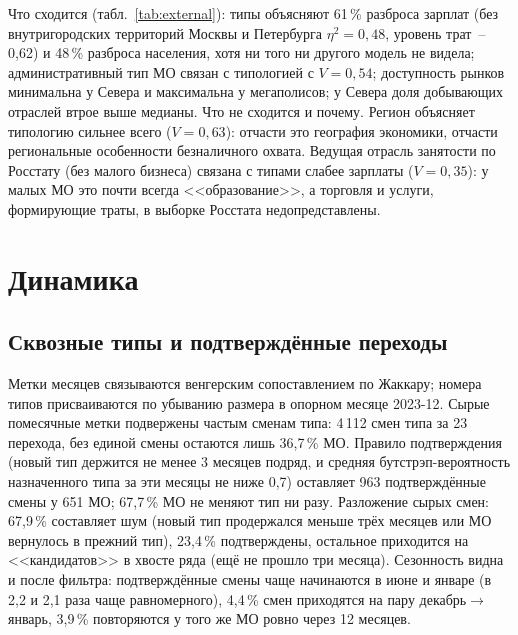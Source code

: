 \documentclass[11pt,a4paper]{article}
\begin{document}
Что сходится (табл.~\ref{tab:external}): типы объясняют 61\,\% разброса зарплат (без внутригородских территорий Москвы и Петербурга $\eta^2=0{,}48$, уровень трат~-- 0,62) и 48\,\% разброса населения, хотя ни того ни другого модель не видела; административный тип МО связан с типологией с $V=0{,}54$; доступность рынков минимальна у Севера и максимальна у мегаполисов; у Севера доля добывающих отраслей втрое выше медианы. Что не сходится и почему. Регион объясняет типологию сильнее всего ($V=0{,}63$): отчасти это география экономики, отчасти региональные особенности безналичного охвата. Ведущая отрасль занятости по Росстату (без малого бизнеса) связана с типами слабее зарплаты ($V=0{,}35$): у малых МО это почти всегда <<образование>>, а торговля и услуги, формирующие траты, в выборке Росстата недопредставлены.

\section{Динамика}\label{sec:dynamics}

\subsection{Сквозные типы и подтверждённые переходы}\label{sec:transitions}

Метки месяцев связываются венгерским сопоставлением по Жаккару; номера типов присваиваются по убыванию размера в опорном месяце 2023-12. Сырые помесячные метки подвержены частым сменам типа: 4\,112 смен типа за 23 перехода, без единой смены остаются лишь 36,7\,\% МО. Правило подтверждения (новый тип держится не менее 3 месяцев подряд, и средняя бутстрэп-вероятность назначенного типа за эти месяцы не ниже 0,7) оставляет 963 подтверждённые смены у 651 МО; 67,7\,\% МО не меняют тип ни разу. Разложение сырых смен: 67,9\,\% составляет шум (новый тип продержался меньше трёх месяцев или МО вернулось в прежний тип), 23,4\,\% подтверждены, остальное приходится на <<кандидатов>> в хвосте ряда (ещё не прошло три месяца). Сезонность видна и после фильтра: подтверждённые смены чаще начинаются в июне и январе (в 2,2 и 2,1 раза чаще равномерного), 4,4\,\% смен приходятся на пару декабрь$\to$январь, 3,9\,\% повторяются у того же МО ровно через 12 месяцев.
\end{document}
